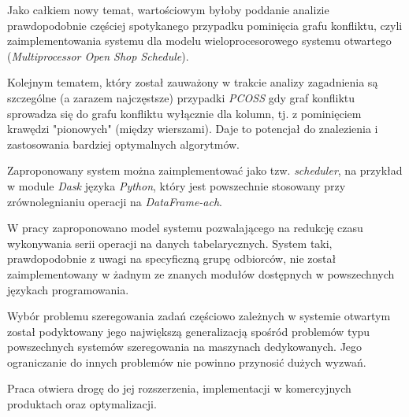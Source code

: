 \documentclass[brudnopis]{xmgr}
\begin{document}
Jako całkiem nowy temat, wartościowym byłoby poddanie analizie prawdopodobnie częściej spotykanego przypadku pominięcia grafu konfliktu, czyli zaimplementowania systemu dla modelu wieloprocesorowego systemu otwartego (\emph{Multiprocessor Open Shop Schedule}).
\medskip

Kolejnym tematem, który został zauważony w trakcie analizy zagadnienia są szczególne (a zarazem najczęstsze) przypadki \emph{PCOSS} gdy graf konfliktu sprowadza się do grafu konfliktu wyłącznie dla kolumn, tj. z pominięciem krawędzi "pionowych" (między wierszami). Daje to potencjał do znalezienia i zastosowania bardziej optymalnych algorytmów.
\medskip

Zaproponowany system można zaimplementować jako tzw. \emph{scheduler}, na przykład w module \emph{Dask} \cite{dask} języka \emph{Python}, który jest powszechnie stosowany przy zrównolegnianiu operacji na \emph{DataFrame-ach}.

\summary

W pracy zaproponowano model systemu pozwalającego na redukcję czasu wykonywania serii operacji na danych tabelarycznych. System taki, prawdopodobnie z uwagi na specyficzną grupę odbiorców, nie został zaimplementowany w żadnym ze znanych modułów dostępnych w powszechnych językach programowania.
\medskip

Wybór problemu szeregowania zadań częściowo zależnych w systemie otwartym został podyktowany jego największą generalizacją spośród problemów typu powszechnych systemów szeregowania na maszynach dedykowanych. Jego ograniczanie do innych problemów nie powinno przynosić dużych wyzwań.
\medskip

Praca otwiera drogę do jej rozszerzenia, implementacji w komercyjnych produktach oraz optymalizacji.








\listoftables

\listoffigures

\oswiadczenie
\end{document}
